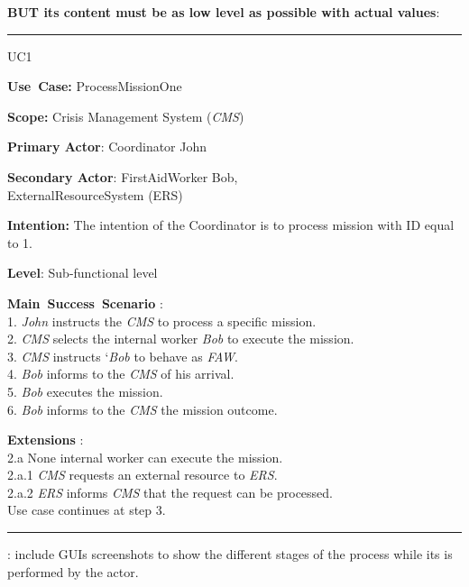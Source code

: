  \cite{armour01usecase} \textbf{BUT its content must be as low level as possible with actual values}:
\vspace{0.5cm}
\hrule
\begin{lyxlist}{UC1}
\small{
\item [\textbf{Use~Case:}] ProcessMissionOne
\item [\textbf{Scope:}] Crisis Management System (\emph{CMS})
\item [\textbf{Primary Actor}:] Coordinator John
\item [\textbf{Secondary Actor}:] FirstAidWorker Bob,\\
                  ExternalResourceSystem (ERS)
\item [\textbf{Intention:}]The intention of the Coordinator is to process mission with ID equal to 1.
\item [\textbf{Level}:]Sub-functional level
\item [\textbf{Main~Success~Scenario}]:\\
1. \emph{John} instructs the \emph{CMS} to process a specific mission.\\
2. \emph{CMS} selects the internal worker \emph{Bob} to execute the mission.\\
3. \emph{CMS} instructs `\emph{Bob} to behave as \emph{FAW}.\\
4. \emph{Bob} informs to the \emph{CMS} of his arrival.\\
5. \emph{Bob} executes the mission.\\
6. \emph{Bob} informs to the \emph{CMS} the mission outcome.


\item [\textbf{Extensions}]:\\
2.a None internal worker can execute the mission.\\
\hspace*{0.5cm} 2.a.1 \emph{CMS} requests an external resource to \emph{ERS}.\\
\hspace*{0.5cm} 2.a.2 \emph{ERS} informs \emph{CMS} that the request can be processed.\\
\hspace*{1.4cm} Use case continues at step 3.

}

\end{lyxlist}
\hrule
\vspace{0.5cm}

: include GUIs screenshots to show the
different stages of the process while its is performed by the actor.



